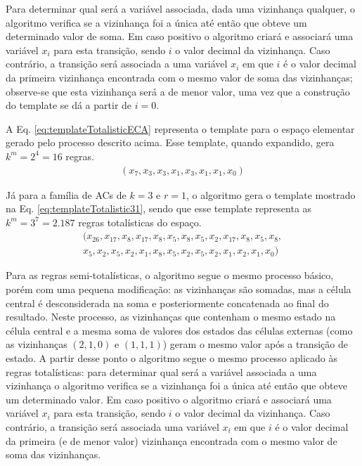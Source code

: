 Para determinar qual será a variável associada, dada uma vizinhança qualquer, o algoritmo verifica se a vizinhança foi a única até então que obteve um determinado valor de soma. Em caso positivo o algoritmo criará e associará uma variável $x_i$ para esta transição, sendo $i$ o valor decimal da vizinhança. Caso contrário, a transição será associada a uma variável $x_i$ em que $i$ é o valor decimal da primeira vizinhança encontrada com o mesmo valor de soma das vizinhanças; observe-se que esta vizinhança será a de menor valor, uma vez que a construção do template se dá a partir de $i=0$.

A Eq. \eqref{eq:templateTotalisticECA} representa o template para o espaço elementar gerado pelo processo descrito acima. Esse template, quando expandido, gera $k^m = 2^4 = 16$ regras.
\begin{equation}
\begin{split}
(x_7,x_3,x_3,x_1,x_3,x_1,x_1,x_0)
\label{eq:templateTotalisticECA}
\end{split}
\end{equation}

Já para a família de ACs de $k=3$ e $r=1$, o algoritmo gera o template mostrado na Eq. \eqref{eq:templateTotalistic31}, sendo que esse template representa as $k^m = 3^7 = 2.187$ regras totalísticas do espaço.
\begin{equation}
\begin{split}
(x_{26},x_{17},x_8,x_{17},x_8,x_5,x_8,x_5,x_2,x_{17},x_8,x_5,x_8,\\
x_5,x_2,x_5,x_2,x_1,x_8,x_5,x_2,x_5,x_2,x_1,x_2,x_1,x_0)
\label{eq:templateTotalistic31}
\end{split}
\end{equation}

Para as regras semi-totalísticas, o algoritmo segue o mesmo processo básico, porém com uma pequena modificação: as vizinhanças são somadas, mas a célula central é desconsiderada na soma e posteriormente concatenada ao final do resultado. Neste processo, as vizinhanças que contenham o mesmo estado na célula central e a mesma soma de valores dos estados das células externas (como as vizinhanças $(2,1,0)$ e $(1,1,1)$) geram o mesmo valor após a transição de estado. A partir desse ponto o algoritmo segue o mesmo processo aplicado às regras totalísticas: para determinar qual será a variável associada a uma vizinhança o algoritmo verifica se a vizinhança foi a única até então que obteve um determinado valor. Em caso positivo o algoritmo criará e associará uma variável $x_i$ para esta transição, sendo $i$ o valor decimal da vizinhança. Caso contrário, a transição será associada uma variável $x_i$ em que $i$ é o valor decimal da primeira (e de menor valor) vizinhança encontrada com o mesmo valor de soma das vizinhanças.

